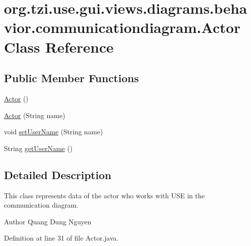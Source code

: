 \hypertarget{classorg_1_1tzi_1_1use_1_1gui_1_1views_1_1diagrams_1_1behavior_1_1communicationdiagram_1_1_actor}{\section{org.\-tzi.\-use.\-gui.\-views.\-diagrams.\-behavior.\-communicationdiagram.\-Actor Class Reference}
\label{classorg_1_1tzi_1_1use_1_1gui_1_1views_1_1diagrams_1_1behavior_1_1communicationdiagram_1_1_actor}
}
\subsection*{Public Member Functions}
\begin{DoxyCompactItemize}
\item 
\hyperlink{classorg_1_1tzi_1_1use_1_1gui_1_1views_1_1diagrams_1_1behavior_1_1communicationdiagram_1_1_actor_a78dbec16bb24075b5d2b522fc6b1dfaa}{Actor} ()
\item 
\hyperlink{classorg_1_1tzi_1_1use_1_1gui_1_1views_1_1diagrams_1_1behavior_1_1communicationdiagram_1_1_actor_a15ad9a851cf003cf859381e921c42286}{Actor} (String name)
\item 
void \hyperlink{classorg_1_1tzi_1_1use_1_1gui_1_1views_1_1diagrams_1_1behavior_1_1communicationdiagram_1_1_actor_a9aa450668deb14c96185b7df7595464d}{set\-User\-Name} (String name)
\item 
String \hyperlink{classorg_1_1tzi_1_1use_1_1gui_1_1views_1_1diagrams_1_1behavior_1_1communicationdiagram_1_1_actor_a608926b64b8cbe103f2534f137b85981}{get\-User\-Name} ()
\end{DoxyCompactItemize}


\subsection{Detailed Description}
This class represents data of the actor who works with U\-S\-E in the communication diagram.

\begin{DoxyAuthor}{Author}
Quang Dung Nguyen 
\end{DoxyAuthor}


Definition at line 31 of file Actor.\-java.




